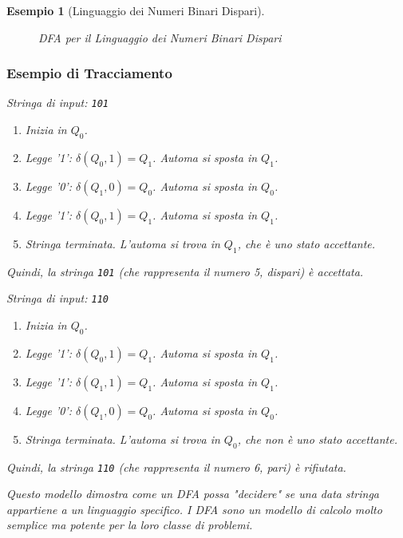 \documentclass[a4paper]{article}
\newtheorem{example}{Esempio}
\begin{document}
\begin{example}[Linguaggio dei Numeri Binari Dispari]
\begin{figure}[h!]
    \caption{DFA per il Linguaggio dei Numeri Binari Dispari}
\end{figure}

\subsubsection{Esempio di Tracciamento}
Stringa di input: \texttt{101}
\begin{enumerate}
    \item Inizia in $Q_0$.
    \item Legge '1': $\delta(Q_0, 1) = Q_1$. Automa si sposta in $Q_1$.
    \item Legge '0': $\delta(Q_1, 0) = Q_0$. Automa si sposta in $Q_0$.
    \item Legge '1': $\delta(Q_0, 1) = Q_1$. Automa si sposta in $Q_1$.
    \item Stringa terminata. L'automa si trova in $Q_1$, che è uno stato accettante.
\end{enumerate}
Quindi, la stringa \texttt{101} (che rappresenta il numero 5, dispari) è accettata.

Stringa di input: \texttt{110}
\begin{enumerate}
    \item Inizia in $Q_0$.
    \item Legge '1': $\delta(Q_0, 1) = Q_1$. Automa si sposta in $Q_1$.
    \item Legge '1': $\delta(Q_1, 1) = Q_1$. Automa si sposta in $Q_1$.
    \item Legge '0': $\delta(Q_1, 0) = Q_0$. Automa si sposta in $Q_0$.
    \item Stringa terminata. L'automa si trova in $Q_0$, che non è uno stato accettante.
\end{enumerate}
Quindi, la stringa \texttt{110} (che rappresenta il numero 6, pari) è rifiutata.

Questo modello dimostra come un DFA possa "decidere" se una data stringa appartiene a un linguaggio specifico. I DFA sono un modello di calcolo molto semplice ma potente per la loro classe di problemi.
\end{example}
\end{document}

